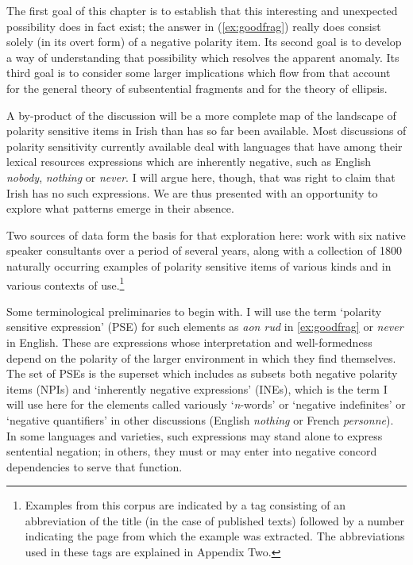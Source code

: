 \documentclass[output=paper,colorlinks,citecolor=brown]{langscibook}
\begin{document}
The first goal of this chapter is to establish that this interesting and unexpected possibility does in fact exist; the answer in (\ref{ex:goodfrag}) really does consist solely (in its overt form) of a negative polarity item. Its second goal is to develop a way of understanding that possibility which resolves the apparent anomaly. Its third goal is to consider some larger implications which flow from that account for the general theory of subsentential fragments and for the theory of ellipsis.

A by-product of the discussion will be a more complete map of the landscape of polarity sensitive items in Irish than has so far been available.  Most discussions of polarity sensitivity currently available deal with languages that have among their lexical resources expressions which are inherently negative, such as English {\itshape nobody}, {\itshape nothing} or {\itshape never}.  I will argue here, though, that \citet{jm:acquaviva:96} was right to claim that Irish has no such expressions. We are thus presented with an opportunity to explore what patterns emerge in their absence.

Two sources of data form the basis for that exploration here: work with six native speaker consultants over a period of several years, along with a collection of 1800 naturally occurring examples of polarity sensitive items of various kinds and in various contexts of use.\footnote{Examples from this corpus are indicated by a tag consisting of an abbreviation of the title (in the case of published texts) followed by a number indicating the page from which the example was extracted. The abbreviations used in these tags are explained in Appendix Two.} 

Some terminological preliminaries to begin with. I will use the term `polarity sensitive expression' (PSE) for such elements as {\itshape aon rud} in \ref{ex:goodfrag} or \textit{never} in English. These are expressions whose interpretation and well-formedness depend on the polarity of the larger environment in which they find themselves.  The set of PSEs is the superset which includes as subsets both negative polarity items (NPIs) and `inherently negative expressions' (INEs), which is the term I will use here for the elements called variously `{\itshape n}-words' or `negative indefinites' or `negative quantifiers' in other discussions (English {\itshape nothing} or French {\itshape personne}). In some languages and varieties, such expressions may stand alone to express sentential negation; in others, they must or may enter into negative concord dependencies to serve that function.
\end{document}
